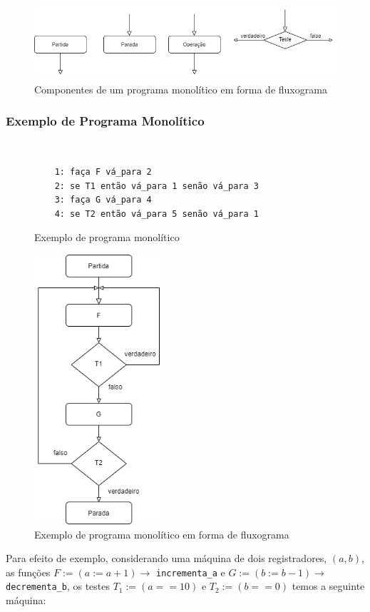 \documentclass[12pt,fleqn]{article}
\begin{document}
\begin{figure}[H]
    \includegraphics[width=\linewidth]{img/monolitico}
    \caption{Componentes de um programa monolítico em forma de fluxograma}
\end{figure}

\subsubsection{Exemplo de Programa Monolítico}
~
\begin{figure}[H]
\begin{verbatim}
    1: faça F vá_para 2
    2: se T1 então vá_para 1 senão vá_para 3
    3: faça G vá_para 4
    4: se T2 então vá_para 5 senão vá_para 1
\end{verbatim}
\caption{Exemplo de programa monolítico}
\end{figure}

\begin{figure}[H]
    \centering
    \includegraphics[height=10cm]{img/monolitico_ex}
    \caption{Exemplo de programa monolítico em forma de fluxograma}
\end{figure}

Para efeito de exemplo, considerando uma máquina de dois registradores, $(a,b)$,
as funções $F := (a := a+1) \rightarrow$ \verb|incrementa_a| e $G := (b := b-1)
\rightarrow$ \verb|decrementa_b|, os testes $T_1 := (a == 10)$ e $T_2 := (b ==
0)$ temos a seguinte máquina:
\end{document}
